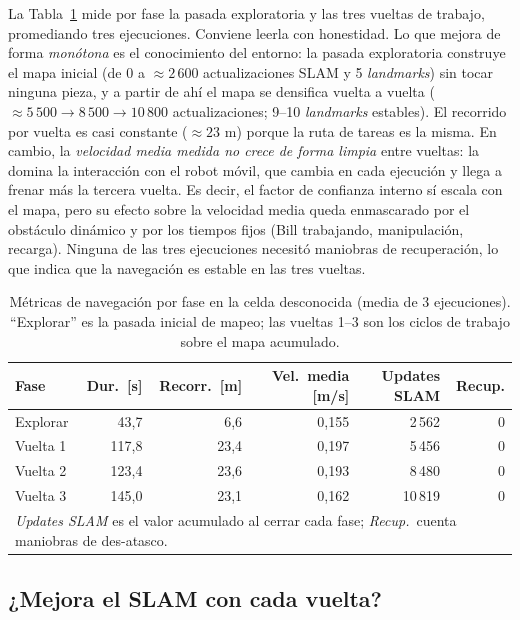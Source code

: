 La Tabla~\ref{tab:phase2-loops} mide por fase la pasada exploratoria y las tres
vueltas de trabajo, promediando tres ejecuciones. Conviene leerla con honestidad.
Lo que mejora de forma \emph{monótona} es el conocimiento del entorno: la pasada
exploratoria construye el mapa inicial (de 0 a \(\approx 2\,600\) actualizaciones
SLAM y 5 \textit{landmarks}) sin tocar ninguna pieza, y a partir de ahí el mapa se
densifica vuelta a vuelta (\(\approx 5\,500 \to 8\,500 \to 10\,800\)
actualizaciones; 9--10 \textit{landmarks} estables). El recorrido por vuelta es casi
constante (\(\approx 23\) m) porque la ruta de tareas es la misma. En cambio, la
\emph{velocidad media medida no crece de forma limpia} entre vueltas: la domina la
interacción con el robot móvil, que cambia en cada ejecución y llega a frenar más la
tercera vuelta. Es decir, el factor de confianza interno sí escala con el mapa, pero
su efecto sobre la velocidad media queda enmascarado por el obstáculo dinámico y por
los tiempos fijos (Bill trabajando, manipulación, recarga). Ninguna de las tres
ejecuciones necesitó maniobras de recuperación, lo que indica que la navegación es
estable en las tres vueltas.

\begin{table}[H]
\centering
\caption{Métricas de navegación por fase en la celda desconocida (media de 3
ejecuciones). ``Explorar'' es la pasada inicial de mapeo; las vueltas 1--3 son
los ciclos de trabajo sobre el mapa acumulado.}\label{tab:phase2-loops}
\small
\begin{tabular}{lrrrrr}
\toprule
\textbf{Fase} & \textbf{Dur.\ [s]} & \textbf{Recorr.\ [m]} & \textbf{Vel.\ media [m/s]} & \textbf{Updates SLAM} & \textbf{Recup.}\\
\midrule
Explorar & 43,7 & 6,6 & 0,155 & 2\,562 & 0\\
Vuelta 1 & 117,8 & 23,4 & 0,197 & 5\,456 & 0\\
Vuelta 2 & 123,4 & 23,6 & 0,193 & 8\,480 & 0\\
Vuelta 3 & 145,0 & 23,1 & 0,162 & 10\,819 & 0\\
\bottomrule
\multicolumn{6}{l}{\footnotesize \textit{Updates SLAM} es el valor acumulado al
cerrar cada fase; \textit{Recup.}\ cuenta maniobras de des-atasco.}\\
\end{tabular}
\end{table}

\subsection{¿Mejora el SLAM con cada vuelta?}

